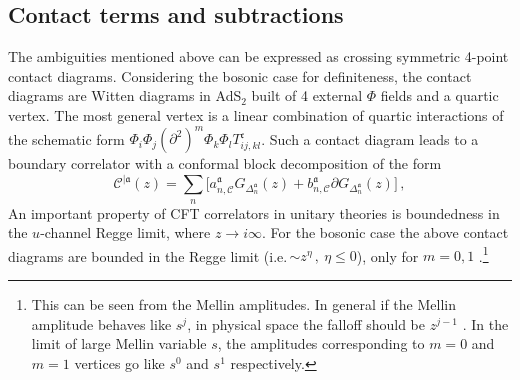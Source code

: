\documentclass[12pt]{article}
\numberwithin{equation}{section}
\newcommand{\be}{\begin{equation}}
\newcommand{\ee}{\end{equation}}
\newcommand{\AK}[1]{{\color{red} \bf [[AK: #1]]}}
\def\d{\delta}
\def\D{\Delta}
\newcommand{\mf}[1]{\mathfrak #1}
\begin{document}
	\subsection{Contact terms and subtractions}
		\label{sec:subtract}
	The ambiguities mentioned above can be expressed as crossing symmetric 4-point contact diagrams. 
	Considering the bosonic case for definiteness, the contact diagrams are Witten diagrams in AdS$_2$ built of 4 external $\Phi$ fields and a quartic vertex. The most general vertex is a linear combination of quartic interactions of the schematic form $\Phi_i\Phi_j(\partial^2)^m\Phi_k\Phi_l T^{\mf c}_{ij,kl}$. Such a contact diagram leads to a boundary correlator with a conformal block decomposition of the form
	\be
	\mathcal{C}^{|\mf a}(z)=\sum_n \big[a_{n,\mathcal{C}}^{\mf{a}} G_{\D_n^{\mf a}}(z)+ b_{n,\mathcal{C}}^{\mf{a}} \partial G_{\D_n^{\mf a}}(z)\big]\,,\label{eq:contactblocks}
	\ee 
	An important property of CFT correlators in unitary theories is boundedness in the $u$-channel Regge limit, where $z\to i \infty$.
	For the bosonic case the above contact diagrams are bounded in the Regge limit (i.e.\,$\sim z^\eta\,, \ \eta\le 0$), only for $m=0,1$ \cite{Gopakumar:2018xqi,Mazac:2018ycv}.\footnote{This can be seen from the Mellin amplitudes. In general if the Mellin amplitude behaves like $s^j$, in physical space the falloff should be $z^{j-1}$ \cite{Mazac:2018ycv}. In the limit of large Mellin variable $s$, the amplitudes corresponding to $m=0$ and $m=1$ vertices go like $s^{0}$ and $s^{1}$ respectively.}
\end{document}
